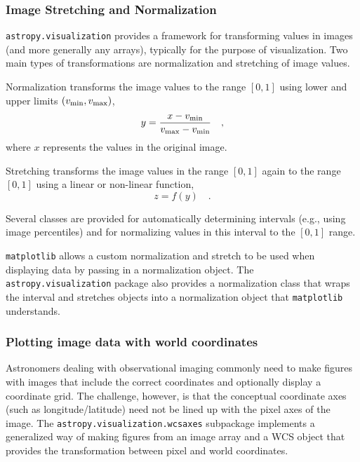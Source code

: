 \documentclass[modern]{aastex61}
\newcommand{\package}[1]{\texttt{#1}\xspace}
\begin{document}
\subsubsection{Image Stretching and Normalization}

\label{sec:stretch}

\package{astropy.visualization} provides a framework for transforming values in
images (and more generally any arrays), typically for the purpose of
visualization. Two main types of transformations are normalization and
stretching of image values.

Normalization transforms the image values to the range $[0,1]$ using lower and
upper limits $(v_{\rm min}, v_{\rm max})$,
\begin{equation}
y = \frac{x - v_{\rm min}}{v_{\rm max} - v_{\rm min}} \quad ,
\end{equation}
where $x$ represents the values in the original image.

Stretching transforms the image values in the range $[0,1]$ again to the range
$[0,1]$ using a linear or non-linear function,
\begin{equation}
z = f(y) \quad .
\end{equation}

Several classes are provided for automatically determining intervals
(e.g., using image percentiles) and for normalizing values in this interval to
the $[0,1]$ range.

\package{matplotlib} allows a custom normalization and stretch to be used when
displaying data by passing in a normalization object.
The \package{astropy.visualization} package also provides a normalization class
that wraps the interval and stretches objects into a normalization object that
\package{matplotlib} understands.

\subsubsection{Plotting image data with world coordinates}

Astronomers dealing with observational imaging commonly need to make figures
with images that include the correct coordinates and optionally display a
coordinate grid. The challenge, however, is that the conceptual coordinate axes
(such as longitude/latitude) need not be lined up with the pixel axes of the
image. The \package{astropy.visualization.wcsaxes} subpackage implements a
generalized way of making figures from an image array and a WCS object
that provides the transformation between pixel and world coordinates.
\end{document}
